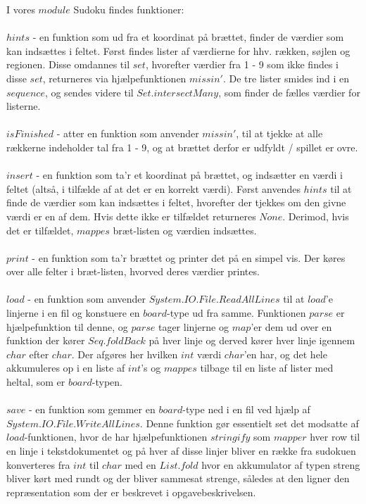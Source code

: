 \documentclass[a4paper]{article}
\begin{document}
	I vores $module$ Sudoku findes funktioner:
	\\\\
	$hints$ - en funktion som ud fra et koordinat på brættet, finder de værdier som kan indsættes i feltet. Først findes lister af værdierne for hhv. rækken, søjlen og regionen. Disse omdannes til $set$, hvorefter værdier fra 1 - 9 som ikke findes i disse $set$, returneres via hjælpefunktionen $missin'$. De tre lister smides ind i en $sequence$, og sendes videre til $Set.intersectMany$, som finder de fælles værdier for listerne.
	\\\\
    $isFinished$ - atter en funktion som anvender $missin'$, til at tjekke at alle rækkerne indeholder tal fra 1 - 9, og at brættet derfor er udfyldt / spillet er ovre.
	\\\\
	$insert$ - en funktion som ta'r et koordinat på brættet, og indsætter en værdi i feltet (altså, i tilfælde af at det er en korrekt værdi). Først anvendes $hints$ til at finde de værdier som kan indsættes i feltet, hvorefter der tjekkes om den givne værdi er en af dem. Hvis dette ikke er tilfældet returneres $None$. Derimod, hvis det er tilfældet, $mappes$ bræt-listen og værdien indsættes.
	\\\\
	$print$ - en funktion som ta'r brættet og printer det på en simpel vis. Der køres over alle felter i bræt-listen, hvorved deres værdier printes.
	\\\\
	$load$ - en funktion som anvender $System.IO.File.ReadAllLines$ til at $load$'e linjerne i en fil og konstuere en $board$-type ud fra samme. Funktionen $parse$ er hjælpefunktion til denne, og $parse$ tager linjerne og $map$'er dem ud over en funktion der kører $Seq.foldBack$ på hver linje og derved kører hver linje igennem $char$ efter $char$. Der afgøres her hvilken $int$ værdi $char$'en har, og det hele akkumuleres op i en liste af $int$'s og $mappes$ tilbage til en liste af lister med heltal, som er $board$-typen.
	\\\\
	$save$ - en funktion som gemmer en $board$-type ned i en fil ved hjælp af $System.IO.File.WriteAllLines$. Denne funktion gør essentielt set det modsatte af $load$-funktionen, hvor de har hjælpefunktionen $stringify$ som $mapper$ hver row til en linje i tekstdokumentet og på hver af disse linjer bliver en række fra sudokuen konverteres fra $int$ til $char$ med en $List.fold$ hvor en akkumulator af typen streng bliver kørt med rundt og der bliver sammesat strenge, således at den ligner den repræsentation som der er beskrevet i opgavebeskrivelsen.
	
\end{document}
